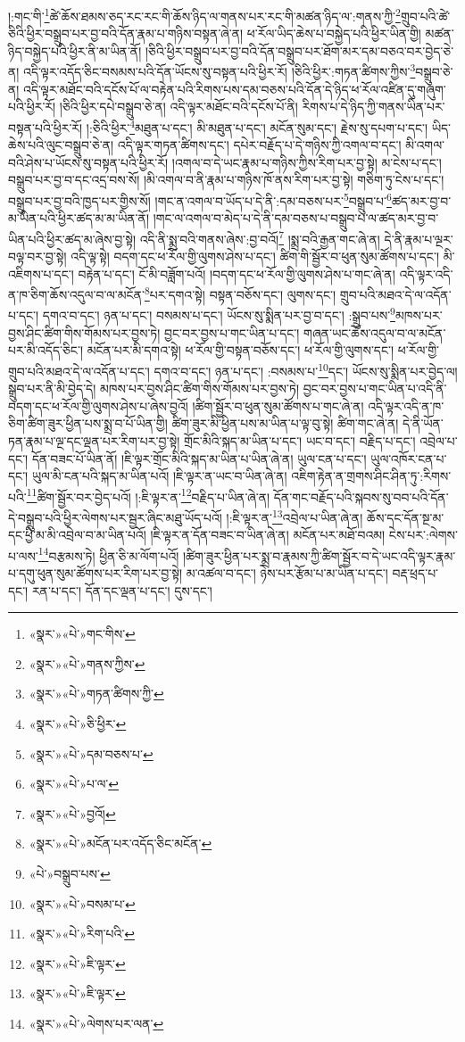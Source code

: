 །:གང་གི་\footnote{«སྣར་»«པེ་»གང་གིས་}ཚེ་ཆོས་ཐམས་ཅད་རང་རང་གི་ཆོས་ཉིད་ལ་གནས་པར་རང་གི་མཚན་ཉིད་ལ་:གནས་ཀྱི་\footnote{«སྣར་»«པེ་»གནས་ཀྱིས་}གྲུབ་པའི་ཚེ་ཅིའི་ཕྱིར་བསྒྲུབ་པར་བྱ་བའི་དོན་རྣམ་པ་གཉིས་བསྟན་ཞེ་ན། ཕ་རོལ་ཡིད་ཆེས་པ་བསྐྱེད་པའི་ཕྱིར་ཡིན་གྱི། མཚན་ཉིད་བསྐྱེད་པའི་ཕྱིར་ནི་མ་ཡིན་ནོ། །ཅིའི་ཕྱིར་བསྒྲུབ་པར་བྱ་བའི་དོན་བསྒྲུབ་པར་ཐོག་མར་དམ་བཅའ་བར་བྱེད་ཅེ་ན། འདི་ལྟར་འདོད་ཅིང་བསམས་པའི་དོན་ཡོངས་སུ་བསྟན་པའི་ཕྱིར་རོ། །ཅིའི་ཕྱིར་:གཏན་ཚིགས་ཀྱིས་\footnote{«སྣར་»«པེ་»གཏན་ཚིགས་ཀྱི་}བསྒྲུབ་ཅེ་ན། འདི་ལྟར་མཐོང་བའི་དངོས་པོ་ལ་བརྟེན་པའི་རིགས་པས་དམ་བཅས་པའི་དོན་དེ་ཉིད་ཕ་རོལ་འཛིན་དུ་གཞུག་པའི་ཕྱིར་རོ། །ཅིའི་ཕྱིར་དཔེ་བསྒྲུབ་ཅེ་ན། འདི་ལྟར་མཐོང་བའི་དངོས་པོ་ནི། རིགས་པ་དེ་ཉིད་ཀྱི་གནས་ཡིན་པར་བསྟན་པའི་ཕྱིར་རོ། །:ཅིའི་ཕྱིར་\footnote{«སྣར་»«པེ་»ཅི་ཕྱིར་}མཐུན་པ་དང་། མི་མཐུན་པ་དང་། མངོན་སུམ་དང་། རྗེས་སུ་དཔག་པ་དང་། ཡིད་ཆེས་པའི་ལུང་བསྒྲུབ་ཅེ་ན། འདི་ལྟར་གཏན་ཚིགས་དང་། དཔེར་བརྗོད་པ་དེ་གཉིས་ཀྱི་འགལ་བ་དང་། མི་འགལ་བའི་ཤེས་པ་ཡོངས་སུ་བསྟན་པའི་ཕྱིར་རོ། །འགལ་བ་དེ་ཡང་རྣམ་པ་གཉིས་ཀྱིས་རིག་པར་བྱ་སྟེ། མ་ངེས་པ་དང་། བསྒྲུབ་པར་བྱ་བ་དང་འདྲ་བས་སོ། །མི་འགལ་བ་ནི་རྣམ་པ་གཉིས་ཁོ་ནས་རིག་པར་བྱ་སྟེ། གཅིག་ཏུ་ངེས་པ་དང་། བསྒྲུབ་པར་བྱ་བའི་ཁྱད་པར་གྱིས་སོ། །གང་ན་འགལ་བ་ཡོད་པ་དེ་ནི་:དམ་བཅས་པར་\footnote{«སྣར་»«པེ་»དམ་བཅས་པ་}བསྒྲུབ་པ་\footnote{«སྣར་»«པེ་»པ་ལ་}ཚད་མར་བྱ་བ་མ་ཡིན་པའི་ཕྱིར་ཚད་མ་མ་ཡིན་ནོ། །གང་ལ་འགལ་བ་མེད་པ་དེ་ནི་དམ་བཅས་པ་བསྒྲུབ་པ་ལ་ཚད་མར་བྱ་བ་ཡིན་པའི་ཕྱིར་ཚད་མ་ཞེས་བྱ་སྟེ། འདི་ནི་སྨྲ་བའི་གནས་ཞེས་:བྱ་བའོ།\footnote{«སྣར་»«པེ་»བྱའོ།} །སྨྲ་བའི་རྒྱན་གང་ཞེ་ན། དེ་ནི་རྣམ་པ་ལྔར་བལྟ་བར་བྱ་སྟེ། འདི་ལྟ་སྟེ། བདག་དང་ཕ་རོལ་གྱི་ལུགས་ཤེས་པ་དང་། ཚིག་གི་སྦྱོར་བ་ཕུན་སུམ་ཚོགས་པ་དང་། མི་འཇིགས་པ་དང་། བརྟེན་པ་དང་། ངོ་མི་བཟློག་པའོ། །བདག་དང་ཕ་རོལ་གྱི་ལུགས་ཤེས་པ་གང་ཞེ་ན། འདི་ལྟར་འདི་ན་ཁ་ཅིག་ཆོས་འདུལ་བ་ལ་མངོན་\footnote{«སྣར་»«པེ་»མངོན་པར་འདོད་ཅིང་མངོན་}པར་དགའ་སྟེ། བསྟན་བཅོས་དང་། ལུགས་དང་། གྲུབ་པའི་མཐའ་དེ་ལ་འདོན་པ་དང་། དགའ་བ་དང་། ཉན་པ་དང་། བསམས་པ་དང་། ཡོངས་སུ་སྨིན་པར་བྱ་བ་དང་། :སྒྲུབ་པས་\footnote{«པེ་»བསྒྲུབ་པས་}མཁས་པར་བྱས་ཤིང་ཚིག་གིས་གོམས་པར་བྱས་ཏེ། བྱང་བར་བྱས་པ་གང་ཡིན་པ་དང་། གཞན་ཡང་ཆོས་འདུལ་བ་ལ་མངོན་པར་མི་འདོད་ཅིང་། མངོན་པར་མི་དགའ་སྟེ། ཕ་རོལ་གྱི་བསྟན་བཅོས་དང་། ཕ་རོལ་གྱི་ལུགས་དང་། ཕ་རོལ་གྱི་གྲུབ་པའི་མཐའ་དེ་ལ་འདོན་པ་དང་། དགའ་བ་དང་། ཉན་པ་དང་། :བསམས་པ་\footnote{«སྣར་»«པེ་»བསམ་པ་}དང་། ཡོངས་སུ་སྨིན་པར་བྱེད་ལ། སྒྲུབ་པར་ནི་མི་བྱེད་དེ། མཁས་པར་བྱས་ཤིང་ཚིག་གིས་གོམས་པར་བྱས་ཏེ། བྱང་བར་བྱས་པ་གང་ཡིན་པ་འདི་ནི་བདག་དང་ཕ་རོལ་གྱི་ལུགས་ཤེས་པ་ཞེས་བྱའོ། །ཚིག་སྦྱོར་བ་ཕུན་སུམ་ཚོགས་པ་གང་ཞེ་ན། འདི་ལྟར་འདི་ན་ཁ་ཅིག་ཚིག་ཟུར་ཕྱིན་པས་སྨྲ་བ་པོ་ཡིན་གྱི། ཚིག་ཟུར་མི་ཕྱིན་པས་མ་ཡིན་པ་ལྟ་བུ་སྟེ། ཚིག་གང་ཞེ་ན། དེ་ནི་ཡོན་ཏན་རྣམ་པ་ལྔ་དང་ལྡན་པར་རིག་པར་བྱ་སྟེ། གྲོང་མིའི་སྐད་མ་ཡིན་པ་དང་། ཡང་བ་དང་། བརྗིད་པ་དང་། འབྲེལ་པ་དང་། དོན་བཟང་པོ་ཡིན་ནོ། །ཇི་ལྟར་གྲོང་མིའི་སྐད་མ་ཡིན་པ་ཡིན་ཞེ་ན། ཡུལ་ངན་པ་དང་། ཡུལ་འཁོར་ངན་པ་དང་། ཡུལ་མི་ངན་པའི་སྐད་མ་ཡིན་པའོ། །ཇི་ལྟར་ན་ཡང་བ་ཡིན་ཞེ་ན། འཇིག་རྟེན་ན་གྲགས་ཤིང་ཤིན་ཏུ་:རིགས་པའི་\footnote{«སྣར་»«པེ་»རིག་པའི་}ཚིག་སྦྱོར་བར་བྱེད་པའོ། །:ཇི་ལྟར་ན་\footnote{«སྣར་»«པེ་»ཇི་ལྟར་}བརྗིད་པ་ཡིན་ཞེ་ན། དོན་གང་བརྗོད་པའི་སྐབས་སུ་བབ་པའི་དོན་དེ་བསྒྲུབ་པའི་ཕྱིར་ལེགས་པར་སྦྱར་ཞིང་མཐུ་ཡོད་པའོ། །:ཇི་ལྟར་ན་\footnote{«སྣར་»«པེ་»ཇི་ལྟར་}འབྲེལ་པ་ཡིན་ཞེ་ན། ཆོས་དང་དོན་སྔ་མ་དང་ཕྱི་མ་མི་འབྲེལ་བ་མ་ཡིན་པའོ། །ཇི་ལྟར་ན་དོན་བཟང་བ་ཡིན་ཞེ་ན། མངོན་པར་མཐོ་བའམ། ངེས་པར་:ལེགས་པ་ལས་\footnote{«སྣར་»«པེ་»ལེགས་པར་ལན་}བརྩམས་ཏེ། ཕྱིན་ཅི་མ་ལོག་པའོ། །ཚིག་ཟུར་ཕྱིན་པར་སྨྲ་བ་རྣམས་ཀྱི་ཚིག་སྦྱོར་བ་དེ་ཡང་འདི་ལྟར་རྣམ་པ་དགུ་ཕུན་སུམ་ཚོགས་པར་རིག་པར་བྱ་སྟེ། མ་འཚལ་བ་དང་། ཉེས་པར་རྩོམ་པ་མ་ཡིན་པ་དང་། བརྡ་ཕྲད་པ་དང་། རན་པ་དང་། དོན་དང་ལྡན་པ་དང་། དུས་དང་། 